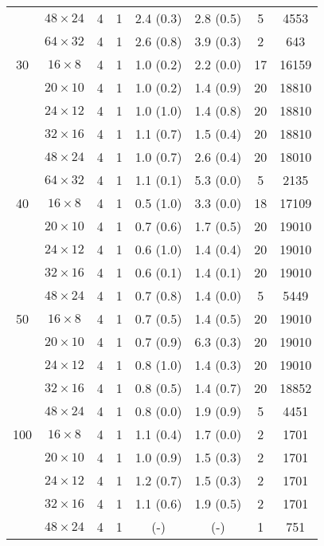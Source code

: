 \begin{longtable}{cccccccc}
    & $48 \times  24$ &  4 & 1 & 2.4 \; (0.3) & 2.8 \; (0.5) & 5 & 4553 \\
    & $64 \times  32$ &  4 & 1 & 2.6 \; (0.8) & 3.9 \; (0.3) & 2 & 643 \\
\midrule
 30 & $16 \times   8$ &  4 & 1 & 1.0 \; (0.2) & 2.2 \; (0.0) & 17 & 16159 \\
    & $20 \times  10$ &  4 & 1 & 1.0 \; (0.2) & 1.4 \; (0.9) & 20 & 18810 \\
    & $24 \times  12$ &  4 & 1 & 1.0 \; (1.0) & 1.4 \; (0.8) & 20 & 18810 \\
    & $32 \times  16$ &  4 & 1 & 1.1 \; (0.7) & 1.5 \; (0.4) & 20 & 18810 \\
    & $48 \times  24$ &  4 & 1 & 1.0 \; (0.7) & 2.6 \; (0.4) & 20 & 18010 \\
    & $64 \times  32$ &  4 & 1 & 1.1 \; (0.1) & 5.3 \; (0.0) & 5 & 2135 \\
\midrule
 40 & $16 \times   8$ &  4 & 1 & 0.5 \; (1.0) & 3.3 \; (0.0) & 18 & 17109 \\
    & $20 \times  10$ &  4 & 1 & 0.7 \; (0.6) & 1.7 \; (0.5) & 20 & 19010 \\
    & $24 \times  12$ &  4 & 1 & 0.6 \; (1.0) & 1.4 \; (0.4) & 20 & 19010 \\
    & $32 \times  16$ &  4 & 1 & 0.6 \; (0.1) & 1.4 \; (0.1) & 20 & 19010 \\
    & $48 \times  24$ &  4 & 1 & 0.7 \; (0.8) & 1.4 \; (0.0) & 5 & 5449 \\
\midrule
 50 & $16 \times   8$ &  4 & 1 & 0.7 \; (0.5) & 1.4 \; (0.5) & 20 & 19010 \\
    & $20 \times  10$ &  4 & 1 & 0.7 \; (0.9) & 6.3 \; (0.3) & 20 & 19010 \\
    & $24 \times  12$ &  4 & 1 & 0.8 \; (1.0) & 1.4 \; (0.3) & 20 & 19010 \\
    & $32 \times  16$ &  4 & 1 & 0.8 \; (0.5) & 1.4 \; (0.7) & 20 & 18852 \\
    & $48 \times  24$ &  4 & 1 & 0.8 \; (0.0) & 1.9 \; (0.9) & 5 & 4451 \\
\midrule
100 & $16 \times   8$ &  4 & 1 & 1.1 \; (0.4) & 1.7 \; (0.0) & 2 & 1701 \\
    & $20 \times  10$ &  4 & 1 & 1.0 \; (0.9) & 1.5 \; (0.3) & 2 & 1701 \\
    & $24 \times  12$ &  4 & 1 & 1.2 \; (0.7) & 1.5 \; (0.3) & 2 & 1701 \\
    & $32 \times  16$ &  4 & 1 & 1.1 \; (0.6) & 1.9 \; (0.5) & 2 & 1701 \\
    & $48 \times  24$ &  4 & 1 & \!\!\!\! 1.1 \quad (-) & \!\!\!\! 2.0 \quad (-) & 1 & 751 \\

\end{longtable}

